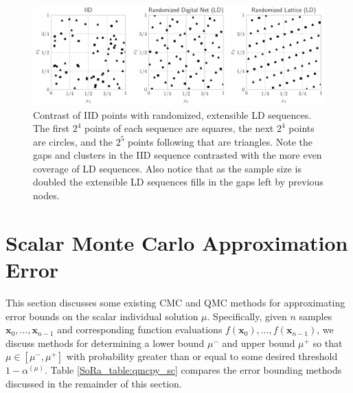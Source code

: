 \documentclass[graybox]{svmult}
\begin{document}
\begin{figure}[t]
    \centering
    \includegraphics[width=\textwidth]{figs/ld_seqs.pdf}
    \caption{Contrast of IID points with randomized, extensible LD sequences. The first $2^4$ points of each sequence are squares, the next $2^4$ points are circles, and the $2^5$ points following that are triangles. Note the gaps and clusters in the IID sequence contrasted with the more even coverage of LD sequences. Also notice that as the sample size is doubled the extensible LD sequences fills in the gaps left by previous nodes.}
    \label{SoRa_fig:ld_seqs}
\end{figure}

\section{Scalar Monte Carlo Approximation Error}\label{SoRa_sec:Existing_QMC_Methods}

This section discusses some existing CMC and QMC methods for approximating error bounds on the scalar individual solution $\mu$. Specifically, given $n$ samples $\boldsymbol{x}_0,\dots,\boldsymbol{x}_{n-1}$ and corresponding function evaluations $f(\boldsymbol{x}_0),\dots,f(\boldsymbol{x}_{n-1})$, we discuss methods for determining a lower bound $\mu^-$ and upper bound $\mu^+$ so that $\mu \in [\mu^-,\mu^+]$ with probability greater than or equal to some desired threshold $1-\alpha^{(\mu)}$. Table \ref{SoRa_table:qmcpy_sc} compares the error bounding methods discussed in the remainder of this section.
\end{document}
